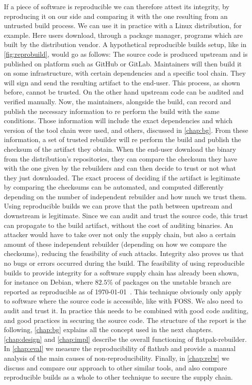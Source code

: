 \documentclass[a4paper,11pt,oneside]{report}
\theoremstyle{definition}
\newcommand{\sysname}{flatpak-rebuilder\xspace}
\newcommand{\rb}{reproducible builds\xspace}
\newcommand{\fh}{flathub\xspace}
\begin{document}
If a piece of software is reproducible we can therefore attest its integrity,
by reproducing it on our side and comparing it with the one resulting from an
untrusted build process. We can use it in practice with a Linux distribution,
for example. Here users download, through a package manager, programs which are
built by the distribution vendor. A hypothetical \rb setup, like in
\autoref{fig:reprobuild}, would go as follows: The source code is produced
upstream and is published on platform such as GitHub or GitLab. Maintainers
will then build it on some infrastructure, with certain dependencies and a
specific tool chain. They will sign and send the resulting artifact to the
end-user. This process, as shown before, cannot be trusted. On the other hand
upstream code can be audited and verified manually. Now, the maintainers,
alongside the build, can record and publish the necessary information to re
perform the build with the same conditions. Those information will include the
exact dependencies and which version of the tool chain were used, and others,
discussed in \autoref{chap:bg}. From these information, a set of trusted
rebuilder will re perform the build and publish the checksum of the artifact
they obtain. When the end-user download the binary from the distribution's
repositories, they can compare the checksum they have with the one given by the
rebuilders and can then decide to trust or not what they just downloaded. The
exact process of deciding if the artifact is legitimate by comparing the
checksums can be automated, and computed differently depending on the number of
independent rebuilder and how much we trust them.
Using \rb we can prove that the path between upstream and downstream is
legitimate. Since we can audit and trust the source code, this trust can
propagate to the build artifact, without the cost of auditing binaries. An
attacker would have to take over not only the supply chain, but also a certain
amount of these independent rebuilder (depending on how we compare the
checksums), reducing the feasibility of such attacks. Integrity also proves us
that no bugs or errors occurred during the build. The feasibility of using \rb
to provide integrity for a software supply chain has already been shown, for
instance on Debian, where $82.5\%$ of packages on the unstable branch are
reported as reproducible as of \today~\cite{debian:repro}.
This technique obviously only apply to software where the source code is
accessible, like with FOSS. We also need to audit and trust it. In practice
this needs to be combined with good code auditing, and good practices in
securing the source code.
The structure of the report is the following, \autoref{chap:bg} explains all
the concept used in the next chapters. \autoref{chap:design} and
\autoref{chap:impl} describe the overall functioning of \sysname. In
\autoref{chap:eval} we measure the reproducibility of \fh and provide a manual
analysis of the main causes of non-reproducibility. Finally, in
\autoref{chap:relw} we discuss and compare our approach to other similar tools,
and also compare \rb as a whole to other technique to secure the supply chain.
\end{document}

